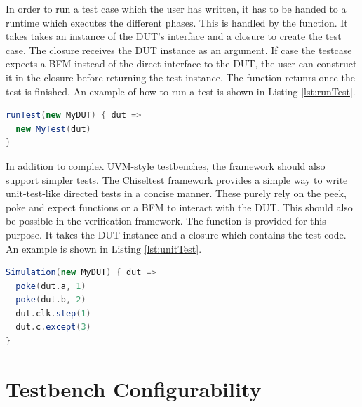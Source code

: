 In order to run a test case which the user has written, it has to be handed to a runtime which executes the different
phases. This is handled by the  function. It takes takes an instance of the DUT's interface and a
closure to create the test case. The closure receives the DUT instance as an argument. If case the testcase expects a
BFM instead of the direct interface to the DUT, the user can construct it in the closure before returning the test
instance. The  function retunrs once the test is finished. An example of how to run a test is shown in
Listing \ref{lst:runTest}.

\begin{listing}
\begin{lstlisting}[language=scala, captionpos=b, caption=Example code for running a test case using the verification framework.,label=lst:runTest]
runTest(new MyDUT) { dut =>
  new MyTest(dut)
}
\end{lstlisting}
\end{listing}

In addition to complex UVM-style testbenches, the framework should also support simpler tests. The Chiseltest
framework provides a simple way to write unit-test-like directed tests in a concise manner. These purely rely on the
peek, poke and expect functions or a BFM to interact with the DUT. This should also be possible in the verification
framework. The  function is provided for this purpose. It takes the DUT instance and a closure which
contains the test code. An example is shown in Listing \ref{lst:unitTest}.

\begin{listing}
\begin{lstlisting}[language=scala, captionpos=b, caption=Example code for running a test case using the verification framework.,label=lst:unitTest]
Simulation(new MyDUT) { dut =>
  poke(dut.a, 1)
  poke(dut.b, 2)
  dut.clk.step(1)
  dut.c.except(3)
}
\end{lstlisting}
\end{listing}

\section{Testbench Configurability} %

